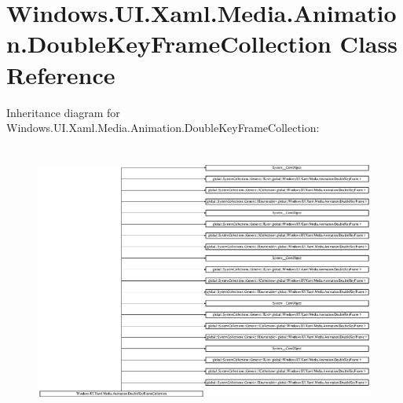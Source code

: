\hypertarget{class_windows_1_1_u_i_1_1_xaml_1_1_media_1_1_animation_1_1_double_key_frame_collection}{}\section{Windows.\+U\+I.\+Xaml.\+Media.\+Animation.\+Double\+Key\+Frame\+Collection Class Reference}
\label{class_windows_1_1_u_i_1_1_xaml_1_1_media_1_1_animation_1_1_double_key_frame_collection}
Inheritance diagram for Windows.\+U\+I.\+Xaml.\+Media.\+Animation.\+Double\+Key\+Frame\+Collection\+:\begin{figure}[H]
\begin{center}
\leavevmode
\includegraphics[height=9.046154cm]{class_windows_1_1_u_i_1_1_xaml_1_1_media_1_1_animation_1_1_double_key_frame_collection}
\end{center}
\end{figure}
